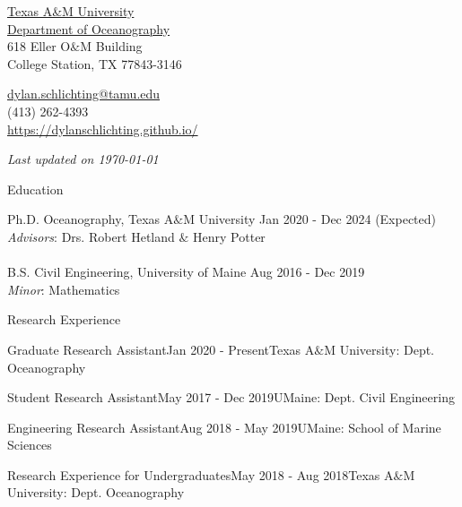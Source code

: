 \documentclass{resume} %
\newcommand{\updateinfo}[1][\today]{\par\vfill{\textit{Last updated on #1}}}
\begin{document}
\begin{minipage}[ht]{0.35\textwidth}
  \href{http://www.tamu.edu/}{Texas A\&M University} \\
  \href{http://ocean.tamu.edu/}{Department of Oceanography} \\
  618 Eller O$\&$M Building  \\
  College Station, TX 77843-3146
\end{minipage}
\begin{minipage}[ht]{0.6\textwidth}
  \href{mailto:dylan.schlichting@tamu.edu}{dylan.schlichting@tamu.edu} \\
  (413) 262-4393\\
  \url{https://dylanschlichting.github.io/}
  \updateinfo
\end{minipage}
\vspace{-65 pt}

\vspace{60pt}
\begin{rSection}{Education}

Ph.D. Oceanography, Texas A$\&$M 
University \hfill {Jan 2020 - Dec 2024 (Expected)
}
\\
\textit{Advisors}: Drs. Robert Hetland $\&$ Henry Potter
\\
\\
B.S. Civil Engineering, University of Maine \hfill {Aug 2016 - Dec 2019}
\\ 
{\textit{Minor}:} Mathematics
\end{rSection}

\begin{rSection}{Research Experience}
\begin{rSubsection}{Graduate Research Assistant}{Jan 2020 - Present}{Texas A$\&$M University: Dept. Oceanography}{} 
\end{rSubsection}    

\begin{rSubsection}{Student Research Assistant}{May 2017 - Dec 2019}{UMaine: Dept. Civil Engineering}{} 
\end{rSubsection}

\begin{rSubsection}{Engineering Research Assistant}{Aug 2018 - May 2019}{UMaine: School of Marine Sciences}{}
\end{rSubsection}

\begin{rSubsection}{Research Experience for Undergraduates}{May 2018 - Aug 2018}{Texas A$\&$M University: Dept. Oceanography}{} 
\end{rSubsection} 
\end{rSection} 
\vspace{-3pt}
\end{document}
